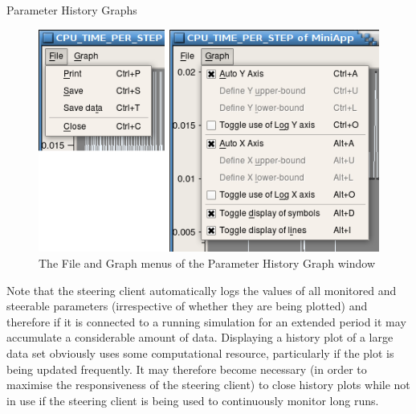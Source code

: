 \documentclass[a4paper,twoside]{article}
\begin{document}
\begin{section}{Parameter History Graphs}
\begin{figure}
\centerline{\includegraphics{hist_plot_menus.png}}
\caption{The File and Graph menus of the Parameter History Graph window}
\label{fig:param_hist_menus}
\end{figure}

Note that the steering client automatically logs the values of all
monitored and steerable parameters (irrespective of whether they are
being plotted) and therefore if it is connected to a running
simulation for an extended period it may accumulate a considerable
amount of data.  Displaying a history plot of a large data set
obviously uses some computational resource, particularly if the plot
is being updated frequently. It may therefore become necessary (in
order to maximise the responsiveness of the steering client) to close
history plots while not in use if the steering client is being used to
continuously monitor long runs.

\end{section} %

\end{document}
